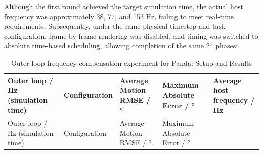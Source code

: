 Although the first round achieved the target simulation time, the actual host frequency was approximately 38, 77, and 153 Hz, failing to meet real-time requirements. Subsequently, under the same physical timestep and task configuration, frame-by-frame rendering was disabled, and timing was switched to absolute time-based scheduling, allowing completion of the same 24 phases:

\FloatBarrier\begingroup\small\setlength{\tabcolsep}{2.5pt}
\begin{longtable}[]{@{}
  >{\raggedright\arraybackslash}p{}
  >{\raggedright\arraybackslash}p{}
  >{\raggedright\arraybackslash}p{}
  >{\raggedright\arraybackslash}p{}
  >{\raggedright\arraybackslash}p{}@{}}
\caption{Outer-loop frequency compensation experiment for Panda: Setup and Results}\label{tab:s04-4}\tabularnewline
\toprule\noalign{}
\begin{minipage}[b]{\linewidth}\raggedright
Outer loop / Hz (simulation time)
\end{minipage} & \begin{minipage}[b]{\linewidth}\raggedright
Configuration
\end{minipage} & \begin{minipage}[b]{\linewidth}\raggedright
Average Motion RMSE / °
\end{minipage} & \begin{minipage}[b]{\linewidth}\raggedright
Maximum Absolute Error / °
\end{minipage} & \begin{minipage}[b]{\linewidth}\raggedright
Average host frequency / Hz
\end{minipage} \\
\midrule\noalign{}
\endfirsthead
\toprule\noalign{}
\begin{minipage}[b]{\linewidth}\raggedright
Outer loop / Hz (simulation time)
\end{minipage} & \begin{minipage}[b]{\linewidth}\raggedright
Configuration
\end{minipage} & \begin{minipage}[b]{\linewidth}\raggedright
Average Motion RMSE / °
\end{minipage} & \begin{minipage}[b]{\linewidth}\raggedright
Maximum Absolute Error / °

\end{minipage}
\end{longtable}
